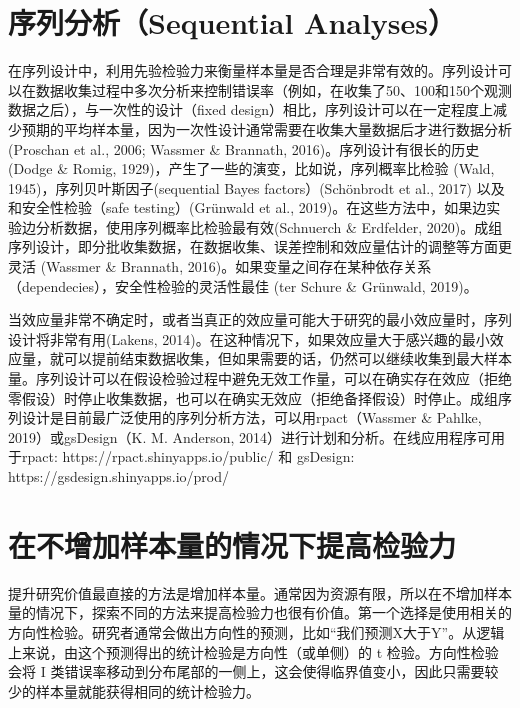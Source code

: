 \documentclass[
  letterpaper,
  DIV=11,
  numbers=noendperiod]{scrreprt}
\begin{document}
\hypertarget{sec-sequentialsamplesize}{%
\section{序列分析（Sequential
Analyses）}\label{sec-sequentialsamplesize}}

在序列设计中，利用先验检验力来衡量样本量是否合理是非常有效的。序列设计可以在数据收集过程中多次分析来控制错误率（例如，在收集了50、100和150个观测数据之后），与一次性的设计（fixed
design）相比，序列设计可以在一定程度上减少预期的平均样本量，因为一次性设计通常需要在收集大量数据后才进行数据分析(Proschan
et al., 2006; Wassmer \& Brannath, 2016)。序列设计有很长的历史(Dodge \&
Romig, 1929)，产生了一些的演变，比如说，序列概率比检验 (Wald,
1945)，序列贝叶斯因子(sequential Bayes factors）(Schönbrodt et al.,
2017) 以及和安全性检验（safe testing）(Grünwald et al.,
2019)。在这些方法中，如果边实验边分析数据，使用序列概率比检验最有效(Schnuerch
\& Erdfelder,
2020)。成组序列设计，即分批收集数据，在数据收集、误差控制和效应量估计的调整等方面更灵活
(Wassmer \& Brannath,
2016)。如果变量之间存在某种依存关系（dependecies），安全性检验的灵活性最佳
(ter Schure \& Grünwald, 2019)。

当效应量非常不确定时，或者当真正的效应量可能大于研究的最小效应量时，序列设计将非常有用(Lakens,
2014)。在这种情况下，如果效应量大于感兴趣的最小效应量，就可以提前结束数据收集，但如果需要的话，仍然可以继续收集到最大样本量。序列设计可以在假设检验过程中避免无效工作量，可以在确实存在效应（拒绝零假设）时停止收集数据，也可以在确实无效应（拒绝备择假设）时停止。成组序列设计是目前最广泛使用的序列分析方法，可以用rpact（Wassmer
\& Pahlke, 2019）或gsDesign（K. M. Anderson,
2014）进行计划和分析。在线应用程序可用于rpact:
https://rpact.shinyapps.io/public/ 和 gsDesign:
https://gsdesign.shinyapps.io/prod/

\hypertarget{ux5728ux4e0dux589eux52a0ux6837ux672cux91cfux7684ux60c5ux51b5ux4e0bux63d0ux9ad8ux68c0ux9a8cux529b}{%
\section{在不增加样本量的情况下提高检验力}\label{ux5728ux4e0dux589eux52a0ux6837ux672cux91cfux7684ux60c5ux51b5ux4e0bux63d0ux9ad8ux68c0ux9a8cux529b}}

提升研究价值最直接的方法是增加样本量。通常因为资源有限，所以在不增加样本量的情况下，探索不同的方法来提高检验力也很有价值。第一个选择是使用相关的方向性检验。研究者通常会做出方向性的预测，比如``我们预测X大于Y''。从逻辑上来说，由这个预测得出的统计检验是方向性（或单侧）的
t 检验。方向性检验会将 I
类错误率移动到分布尾部的一侧上，这会使得临界值变小，因此只需要较少的样本量就能获得相同的统计检验力。
\end{document}
